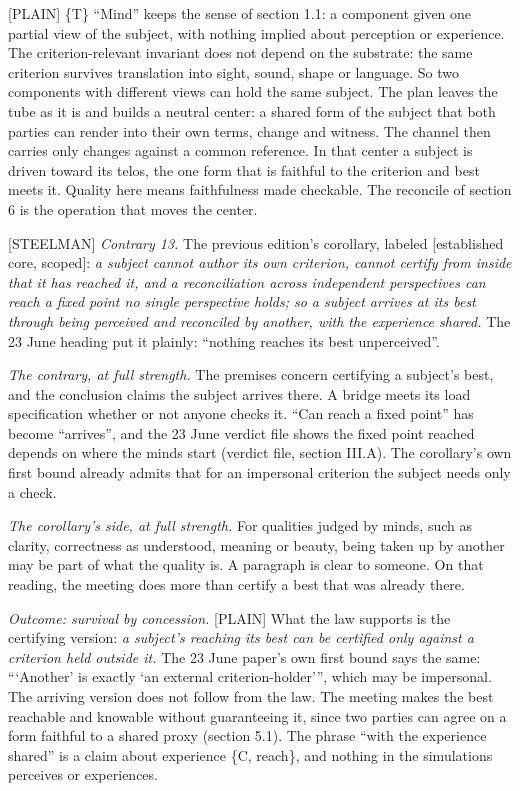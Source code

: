 \documentclass[11pt]{article}
\newcommand{\register}[1]{{\ttfamily\small #1}}
\begin{document}
\register{[PLAIN]} \{T\} ``Mind'' keeps the sense of section 1.1: a component given one partial view of the subject, with nothing implied about perception or experience. The criterion-relevant invariant does not depend on the substrate: the same criterion survives translation into sight, sound, shape or language. So two components with different views can hold the same subject. The plan leaves the tube as it is and builds a neutral center: a shared form of the subject that both parties can render into their own terms, change and witness. The channel then carries only changes against a common reference. In that center a subject is driven toward its telos, the one form that is faithful to the criterion and best meets it. Quality here means faithfulness made checkable. The reconcile of section 6 is the operation that moves the center.

\register{[STEELMAN]} \emph{Contrary 13.} The previous edition's corollary, labeled [established core, scoped]: \emph{a subject cannot author its own criterion, cannot certify from inside that it has reached it, and a reconciliation across independent perspectives can reach a fixed point no single perspective holds; so a subject arrives at its best through being perceived and reconciled by another, with the experience shared.} The 23 June heading put it plainly: ``nothing reaches its best unperceived''.

\emph{The contrary, at full strength.} The premises concern certifying a subject's best, and the conclusion claims the subject arrives there. A bridge meets its load specification whether or not anyone checks it. ``Can reach a fixed point'' has become ``arrives'', and the 23 June verdict file shows the fixed point reached depends on where the minds start (verdict file, section III.A). The corollary's own first bound already admits that for an impersonal criterion the subject needs only a check.

\emph{The corollary's side, at full strength.} For qualities judged by minds, such as clarity, correctness as understood, meaning or beauty, being taken up by another may be part of what the quality is. A paragraph is clear to someone. On that reading, the meeting does more than certify a best that was already there.

\emph{Outcome: survival by concession.} \register{[PLAIN]} What the law supports is the certifying version: \emph{a subject's reaching its best can be certified only against a criterion held outside it.} The 23 June paper's own first bound says the same: ```Another' is exactly `an external criterion-holder'{}'', which may be impersonal. The arriving version does not follow from the law. The meeting makes the best reachable and knowable without guaranteeing it, since two parties can agree on a form faithful to a shared proxy (section 5.1). The phrase ``with the experience shared'' is a claim about experience \{C, reach\}, and nothing in the simulations perceives or experiences.
\end{document}
